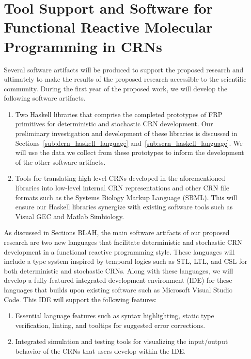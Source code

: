 
\section{Tool Support and Software for Functional Reactive Molecular Programming in CRNs}
\label{sec:software_support}

Several software artifacts will be produced to support the proposed research and ultimately to make the 
results of the proposed research accessible to the scientific community.
During the first year of the proposed work, we will develop the following software artifacts.
\begin{enumerate}
	\item Two Haskell libraries that comprise the completed prototypes of FRP primitives for deterministic and stochastic CRN development.
	Our preliminary investigation and development of these libraries is discussed in Sections~\ref{sub:dcrn_haskell_language} and~\ref{sub:scrn_haskell_language}.
	We will use the data we collect from these prototypes to inform the development of the other software artifacts.
	
	\item Tools for translating high-level CRNs developed in the aforementioned libraries into low-level internal CRN representations and other CRN file formats such as the Systems Biology Markup Language (SBML).
	This will ensure our Haskell libraries synergize with existing software tools such as Visual GEC and Matlab Simbiology.
\end{enumerate}

As discussed in Sections BLAH, the main software artifacts of our proposed research are two new languages that facilitate deterministic and stochastic CRN development in a functional reactive programming style.
These languages will include a type system inspired by temporal logics such as STL, LTL, and CSL for both deterministic and stochastic CRNs.
Along with these languages, we will develop a fully-featured integrated development environment (IDE) for these languages that builds upon existing software such as Microsoft Visual Studio Code.
This IDE will support the following features:
\begin{enumerate}
	\item Essential language features such as syntax highlighting, static type verification, linting, and tooltips for suggested error corrections.

	\item Integrated simulation and testing tools for visualizing the input/output behavior of the CRNs that users develop within the IDE.
\end{enumerate}


